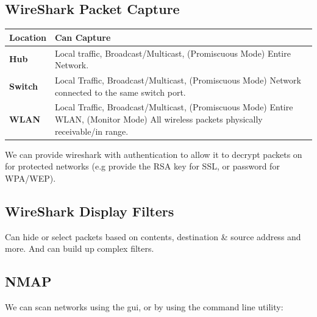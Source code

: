 \subsection*{WireShark Packet Capture}
\begin{center}
    \begin{tabular}{l p{}}
        \textbf{Location} & \textbf{Can Capture}                                                                                                                    \\
        \hline
        \textbf{Hub}      & Local traffic, Broadcast/Multicast, (Promiscuous Mode) Entire Network.                                                                  \\
        \textbf{Switch}   & Local Traffic, Broadcast/Multicast, (Promiscuous Mode) Network connected to the same switch port.                                       \\
        \textbf{WLAN}     & Local Traffic, Broadcast/Multicast, (Promiscuous Mode) Entire WLAN, (Monitor Mode) All wireless packets physically receivable/in range. \\
    \end{tabular}
\end{center}
We can provide wireshark with authentication to allow it to decrypt packets on for protected networks (e.g provide the RSA key for SSL, or password for WPA/WEP).

\subsection{WireShark Display Filters}
Can hide or select packets based on contents, destination \& source address and more. And can build up complex filters.

\subsection{NMAP}
We can scan networks using the gui, or by using the command line utility:
